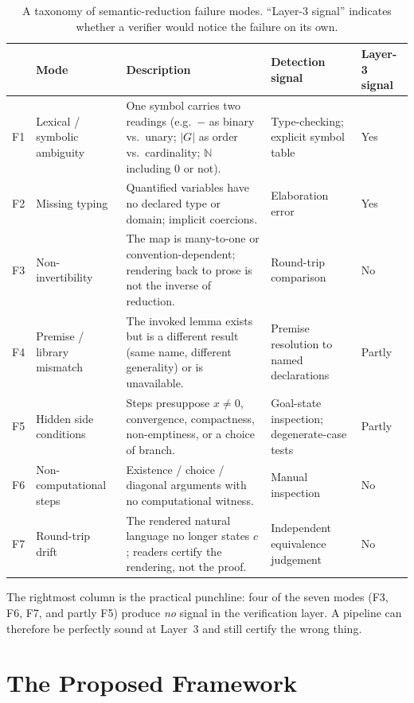 \documentclass[11pt,a4paper]{article}
\theoremstyle{plain}
\theoremstyle{remark}
\begin{document}
\begin{table}[t]
\caption{A taxonomy of semantic-reduction failure modes.  ``Layer-3 signal''
  indicates whether a verifier would notice the failure on its own.}
\label{tab:taxonomy}
\centering\small
\begin{tabular}{@{}p{0.5cm}p{2.5cm}p{5.4cm}p{2.1cm}p{1.5cm}@{}}
\toprule
& \textbf{Mode} & \textbf{Description} & \textbf{Detection signal} & \textbf{Layer-3 signal}\\
\midrule
F1 & Lexical / symbolic ambiguity
  & One symbol carries two readings (e.g.\ $-$ as binary vs.\ unary; $|G|$ as order vs.\ cardinality; $\mathbb{N}$ including $0$ or not).
  & Type-checking; explicit symbol table & Yes \\
F2 & Missing typing
  & Quantified variables have no declared type or domain; implicit coercions.
  & Elaboration error & Yes \\
F3 & Non-invertibility
  & The map is many-to-one or convention-dependent; rendering back to prose is not the inverse of reduction.
  & Round-trip comparison & No \\
F4 & Premise / library mismatch
  & The invoked lemma exists but is a different result (same name, different generality) or is unavailable.
  & Premise resolution to named declarations & Partly \\
F5 & Hidden side conditions
  & Steps presuppose $x\neq 0$, convergence, compactness, non-emptiness, or a choice of branch.
  & Goal-state inspection; degenerate-case tests & Partly \\
F6 & Non-computational steps
  & Existence / choice / diagonal arguments with no computational witness.
  & Manual inspection & No \\
F7 & Round-trip drift
  & The rendered natural language no longer states $c$; readers certify the rendering, not the proof.
  & Independent equivalence judgement & No \\
\bottomrule
\end{tabular}
\end{table}

The rightmost column is the practical punchline: four of the seven modes (F3,
F6, F7, and partly F5) produce \emph{no} signal in the verification layer.  A
pipeline can therefore be perfectly sound at Layer~3 and still certify the
wrong thing.

\section{The Proposed Framework}
\label{sec:framework}
\end{document}
